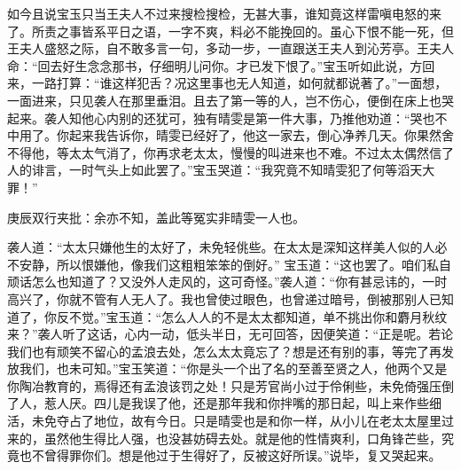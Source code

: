 \begin{parag}


    如今且说宝玉只当王夫人不过来搜检搜检，无甚大事，谁知竟这样雷嗔电怒的来了。所责之事皆系平日之语，一字不爽，料必不能挽回的。虽心下恨不能一死，但王夫人盛怒之际，自不敢多言一句，多动一步，一直跟送王夫人到沁芳亭。王夫人命：“回去好生念念那书，仔细明儿问你。才已发下恨了。”宝玉听如此说，方回来，一路打算：“谁这样犯舌？况这里事也无人知道，如何就都说著了。”一面想，一面进来，只见袭人在那里垂泪。且去了第一等的人，岂不伤心，便倒在床上也哭起来。袭人知他心内别的还犹可，独有晴雯是第一件大事，乃推他劝道：“哭也不中用了。你起来我告诉你，晴雯已经好了，他这一家去，倒心净养几天。你果然舍不得他，等太太气消了，你再求老太太，慢慢的叫进来也不难。不过太太偶然信了人的诽言，一时气头上如此罢了。”宝玉哭道：“我究竟不知晴雯犯了何等滔天大罪！”\begin{note}庚辰双行夹批：余亦不知，盖此等冤实非晴雯一人也。\end{note}袭人道：“太太只嫌他生的太好了，未免轻佻些。在太太是深知这样美人似的人必不安静，所以恨嫌他，像我们这粗粗笨笨的倒好。” 宝玉道：“这也罢了。咱们私自顽话怎么也知道了？又没外人走风的，这可奇怪。”袭人道：“你有甚忌讳的，一时高兴了，你就不管有人无人了。我也曾使过眼色，也曾递过暗号，倒被那别人已知道了，你反不觉。”宝玉道：“怎么人人的不是太太都知道，单不挑出你和麝月秋纹来？”袭人听了这话，心内一动，低头半日，无可回答，因便笑道：“正是呢。若论我们也有顽笑不留心的孟浪去处，怎么太太竟忘了？想是还有别的事，等完了再发放我们，也未可知。”宝玉笑道：“你是头一个出了名的至善至贤之人，他两个又是你陶冶教育的，焉得还有孟浪该罚之处！只是芳官尚小过于伶俐些，未免倚强压倒了人，惹人厌。四儿是我误了他，还是那年我和你拌嘴的那日起，叫上来作些细活，未免夺占了地位，故有今日。只是晴雯也是和你一样，从小儿在老太太屋里过来的，虽然他生得比人强，也没甚妨碍去处。就是他的性情爽利，口角锋芒些，究竟也不曾得罪你们。想是他过于生得好了，反被这好所误。”说毕，复又哭起来。
\end{parag}


